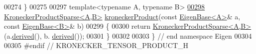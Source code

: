 \begin{DoxyCode}
00274 \}
00275 
00297 \textcolor{keyword}{template}<\textcolor{keyword}{typename} A, \textcolor{keyword}{typename} B>
\hyperlink{namespace_eigen_a4e6cd3acfea39bcff3fa38e0de1226f5}{00298} \hyperlink{class_eigen_1_1_kronecker_product_sparse}{KroneckerProductSparse<A,B>} \hyperlink{namespace_eigen_aedd4b7cd1e324ed0769cac2701f4d050}{kroneckerProduct}(\textcolor{keyword}{const} 
      \hyperlink{group___core___module_struct_eigen_1_1_eigen_base}{EigenBase<A>}& a, \textcolor{keyword}{const} \hyperlink{group___core___module_struct_eigen_1_1_eigen_base}{EigenBase<B>}& b)
00299 \{
00300   \textcolor{keywordflow}{return} \hyperlink{class_eigen_1_1_kronecker_product_sparse}{KroneckerProductSparse<A,B>}(a.\hyperlink{group___core___module_a324b16961a11d2ecfd2d1b7dd7946545}{derived}(), b.
      \hyperlink{group___core___module_a324b16961a11d2ecfd2d1b7dd7946545}{derived}());
00301 \}
00302 
00303 \} \textcolor{comment}{// end namespace Eigen}
00304 
00305 \textcolor{preprocessor}{#endif // KRONECKER\_TENSOR\_PRODUCT\_H}
\end{DoxyCode}
